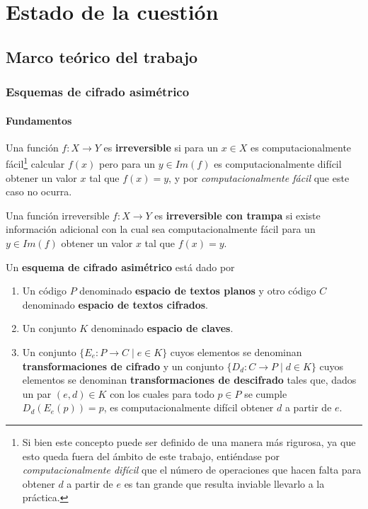 \chapter{Estado de la cuestión}  

\section{Marco teórico del trabajo}

\subsection{Esquemas de cifrado asimétrico}

\subsubsection{Fundamentos}

\begin{definition}
	Una función $f : X \rightarrow Y$ es \textbf{irreversible} si para un $x \in X$ es computacionalmente fácil\footnote{Si bien este concepto puede ser definido de una manera más rigurosa, ya que esto queda fuera del ámbito de este trabajo, entiéndase por \textit{computacionalmente difícil} que el número de operaciones que hacen falta para obtener $d$ a partir de $e$ es tan grande que resulta inviable llevarlo a la práctica.} calcular $f(x)$ pero para un $y \in Im(f)$ es computacionalmente difícil obtener un valor $x$ tal que $f(x) = y$, y por \textit{computacionalmente fácil} que este caso no ocurra.
\end{definition}

\begin{definition}
	Una función irreversible $f : X \rightarrow Y$ es \textbf{irreversible con trampa} si existe información adicional con la cual sea computacionalmente fácil para un $y \in Im(f)$ obtener un valor $x$ tal que $f(x) = y$.
\end{definition}

\begin{definition}
	Un \textbf{esquema de cifrado asimétrico} está dado por
	\begin{enumerate}
		\item Un código $P$ denominado \textbf{espacio de textos planos} y otro código $C$ denominado \textbf{espacio de textos cifrados}.
		\item Un conjunto $K$ denominado \textbf{espacio de claves}.
		\item Un conjunto $\{E_e : P \rightarrow C \mid e \in K\}$ cuyos elementos se denominan \textbf{transformaciones de cifrado} y un conjunto $\{D_d : C \rightarrow P \mid d \in K\}$ cuyos elementos se denominan \textbf{transformaciones de descifrado} tales que, dados un par $(e, d) \in K$ con los cuales para todo $p \in P$ se cumple $D_d(E_e(p)) = p$, es computacionalmente difícil obtener $d$ a partir de $e$.
	\end{enumerate}
\end{definition}

